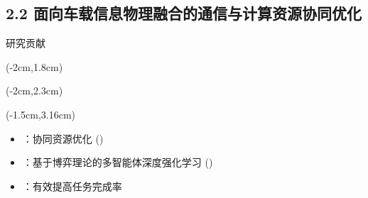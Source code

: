 \subsection[\englishfont 2.2 面向车载信息物理融合的通信与计算资源协同优化]{2.2 面向车载信息物理融合的通信与计算资源协同优化}

\begin{frame}{研究贡献}
\newBackground
\begin{center}
\begin{textblock*}{\textwidth}(-2cm,1.8cm)
  \small \englishfont \colorbox{cqublue}{}
\end{textblock*}
\end{center}

\begin{center}
\begin{textblock*}{\textwidth}(-2cm,2.3cm)
  \small \englishfont \colorbox{cqublue}{}
\end{textblock*}
\end{center}

\begin{center}
\begin{textblock*}{\textwidth}(-1.5cm,3.16cm)
\begin{minipage}[t]{0.75\textwidth}
\begin{itemize}[itemsep=0.2\baselineskip]  \englishfont
	\item[\ding{111}] {{}：协同资源优化 ({\color{red}{CRO}}})
	\item[\ding{111}]  {{}：基于博弈理论的多智能体深度强化学习 ({\color{red}{MAGT}})}
	\begin{itemize}[itemsep=0.2\baselineskip] 
	\end{itemize}
	\item [\ding{111}]  {{}：有效提高任务完成率}
	\end{itemize}
\end{minipage}
\end{textblock*}
\end{center}


\end{frame}
